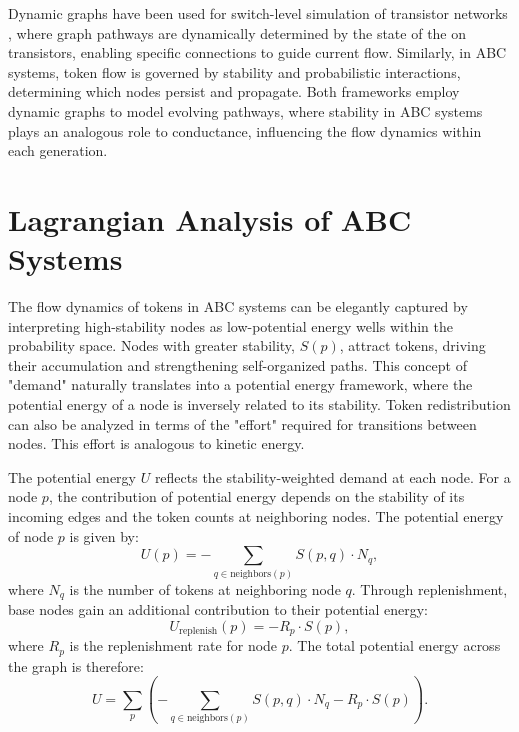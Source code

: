 \documentclass[entropy,article,submit,pdftex,oneauthor]{Definitions/mdpi}
\begin{document}
Dynamic graphs have been used for switch-level simulation of transistor networks \cite{AdlerCAD}, where graph pathways are dynamically determined by the state of the on transistors, enabling specific connections to guide current flow. Similarly, in ABC systems, token flow is governed by stability and probabilistic interactions, determining which nodes persist and propagate. Both frameworks employ dynamic graphs to model evolving pathways, where stability in ABC systems plays an analogous role to conductance, influencing the flow dynamics within each generation.

\section{Lagrangian Analysis of ABC Systems}

The flow dynamics of tokens in ABC systems can be elegantly captured by interpreting high-stability nodes as low-potential energy wells within the probability space. Nodes with greater stability, \( S(p) \), attract tokens, driving their accumulation and strengthening self-organized paths. This concept of "demand" naturally translates into a potential energy framework, where the potential energy of a node is inversely related to its stability. Token redistribution can also be analyzed in terms of the "effort" required for transitions between nodes. This effort is analogous to kinetic energy.

The potential energy \( U \) reflects the stability-weighted demand at each node. For a node \( p \), the contribution of potential energy depends on the stability of its incoming edges and the token counts at neighboring nodes. The potential energy of node \( p \) is given by:
\begin{equation}
U(p) = -\sum_{q \in \text{neighbors}(p)} S(p, q) \cdot N_q,
\end{equation}
where \( N_q \) is the number of tokens at neighboring node \( q \). Through replenishment, base nodes gain an additional contribution to their potential energy:
\begin{equation}
U_{\text{replenish}}(p) = -R_p \cdot S(p),
\end{equation}
where \( R_p \) is the replenishment rate for node \( p \). The total potential energy across the graph is therefore:
\begin{equation}
U = \sum_{p} \left( -\sum_{q \in \text{neighbors}(p)} S(p, q) \cdot N_q - R_p \cdot S(p) \right).
\end{equation}
\end{document}
